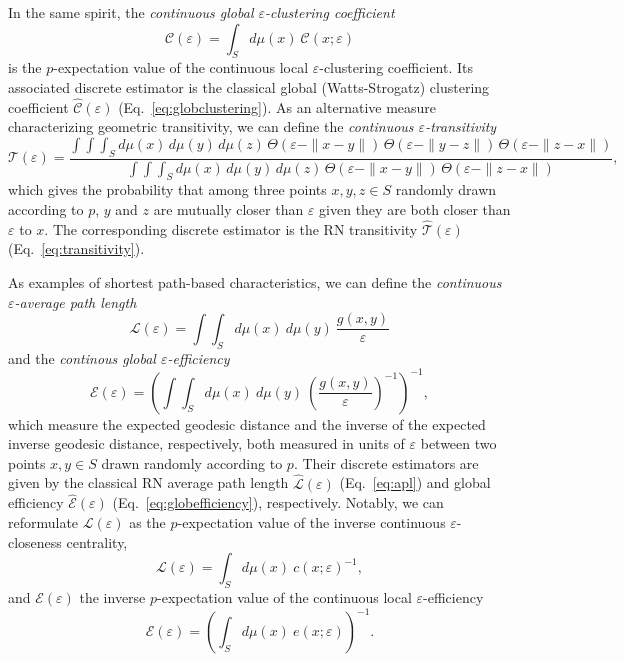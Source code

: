 \documentclass[graybox]{svmult}
\begin{document}
In the same spirit, the \emph{continuous global $\varepsilon$-clustering coefficient}
\begin{equation}
\mathcal{C}(\varepsilon)=\int_S d\mu(x)\ \mathcal{C}(x;\varepsilon)
\end{equation}
\noindent
is the $p$-expectation value of the continuous local $\varepsilon$-clustering coefficient. Its associated discrete estimator is the classical global (Watts-Strogatz) clustering coefficient $\hat{\mathcal{C}}(\varepsilon)$ (Eq.~\ref{eq:globclustering}). As an alternative measure characterizing geometric transitivity, we can define the \emph{continuous $\varepsilon$-transitivity}
\begin{equation}
\mathcal{T}(\varepsilon)=\frac{\int\int\int_S d\mu(x)\, d\mu(y)\, d\mu(z)\, \Theta(\varepsilon-\|x-y\|)\, \Theta(\varepsilon-\|y-z\|)\, \Theta(\varepsilon-\|z-x\|)}{\int\int\int_S d\mu(x)\, d\mu(y)\, d\mu(z)\, \Theta(\varepsilon-\|x-y\|)\, \Theta(\varepsilon-\|z-x\|)},
\end{equation}
\noindent
which gives the probability that among three points $x,y,z\in S$ randomly drawn according to $p$, $y$ and $z$ are mutually closer than $\varepsilon$ given they are both closer than $\varepsilon$ to $x$. The corresponding discrete estimator is the RN transitivity $\hat{\mathcal{T}}(\varepsilon)$ (Eq.~\ref{eq:transitivity}).

As examples of shortest path-based characteristics, we can define the \emph{continuous $\varepsilon$-average path length}
\begin{equation}
\mathcal{L}(\varepsilon)=\int\int_S d\mu(x)\ d\mu(y)\ \frac{g(x,y)}{\varepsilon}
\end{equation}
\noindent
and the \emph{continous global $\varepsilon$-efficiency}
\begin{equation}
\mathcal{E}(\varepsilon)=\left(\int\int_S d\mu(x)\ d\mu(y)\ \left(\frac{g(x,y)}{\varepsilon}\right)^{-1}\right)^{-1},
\end{equation}
\noindent
which measure the expected geodesic distance and the inverse of the expected inverse geodesic distance, respectively, both measured in units of $\varepsilon$ between two points $x,y\in S$ drawn randomly according to $p$. Their discrete estimators are given by the classical RN average path length $\hat{\mathcal{L}}(\varepsilon)$ (Eq.~\ref{eq:apl}) and global efficiency $\hat{\mathcal{E}}(\varepsilon)$ (Eq.~\ref{eq:globefficiency}), respectively. Notably, we can reformulate $\mathcal{L}(\varepsilon)$ as the $p$-expectation value of the inverse continuous $\varepsilon$-closeness centrality,
\begin{equation}
\mathcal{L}(\varepsilon)=\int_S d\mu(x)\ c(x;\varepsilon)^{-1},
\end{equation}
\noindent
and $\mathcal{E}(\varepsilon)$ the inverse $p$-expectation value of the continuous local $\varepsilon$-efficiency
\begin{equation}
\mathcal{E}(\varepsilon)=\left(\int_S d\mu(x)\ e(x;\varepsilon)\right)^{-1}.
\end{equation}
\end{document}

